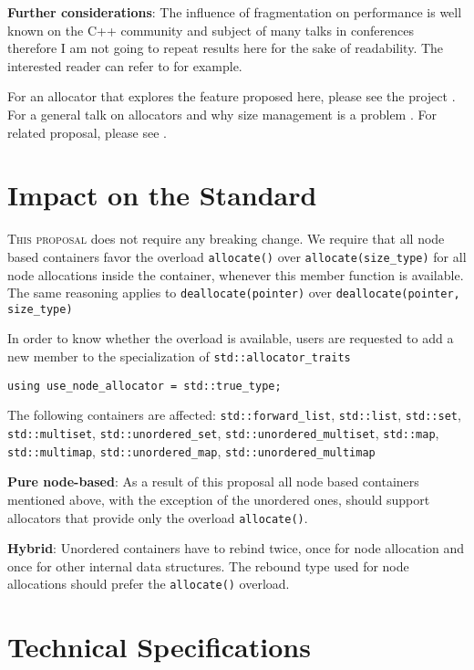 \documentclass[11pt]{article}
\begin{document}
\medskip
\noindent
{\bf Further considerations}: The influence of fragmentation on
performance is well known on the C++ community and subject of many
talks in conferences therefore I am not going to repeat results here
for the sake of readability. The interested reader can refer to
  \cite{chandler, meyers} for example.

For an allocator that explores the feature proposed here, please see
the project \cite{rtcpp}. For a general
talk on allocators and why size management is a problem
\cite{alexandrescu}. For related proposal, please see \cite{prop1}.

\section{Impact on the Standard}

\textsc{This proposal} does not require any breaking change. We
require that all node based containers favor the overload
\texttt{allocate()} over \texttt{allocate(size\_type)} for all node
allocations inside the container, whenever this member function is
available. The same reasoning applies to \texttt{deallocate(pointer)}
over \texttt{deallocate(pointer, size\_type)}

In order to know whether the overload is available, users are
requested to add a new member to the specialization of
\texttt{std::allocator\_traits}

\medskip
\begin{lstlisting}
using use_node_allocator = std::true_type;
\end{lstlisting}

The following containers are affected: \texttt{std::forward\_list},
\texttt{std::list}, \texttt{std::set}, \texttt{std::multiset},
\texttt{std::unordered\_set}, \texttt{std::unordered\_multiset},
\texttt{std::map}, \texttt{std::multimap},
\texttt{std::unordered\_map}, \texttt{std::unordered\_multimap}

\medskip
\noindent
{\bf Pure node-based}: As a result of this proposal all node based
containers mentioned above, with the exception of the unordered ones,
should support allocators that provide only the overload
\texttt{allocate()}.

\medskip
\noindent
{\bf Hybrid}: Unordered containers have to rebind twice, once
for node allocation and once for other internal data structures.
The rebound type used for node allocations should prefer the 
\texttt{allocate()} overload.

\section{Technical Specifications}
\end{document}
